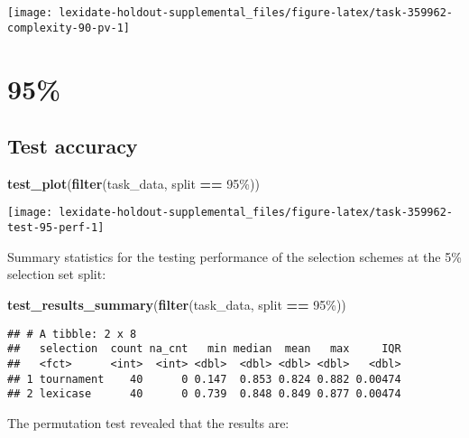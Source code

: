 \documentclass[
]{book}
\newenvironment{Shaded}{\begin{snugshade}}{\end{snugshade}}
\newcommand{\FunctionTok}[1]{\textcolor[rgb]{0.13,0.29,0.53}{\textbf{#1}}}
\newcommand{\NormalTok}[1]{#1}
\newcommand{\SpecialCharTok}[1]{\textcolor[rgb]{0.81,0.36,0.00}{\textbf{#1}}}
\newcommand{\StringTok}[1]{\textcolor[rgb]{0.31,0.60,0.02}{#1}}
\begin{document}
\texttt{[image: lexidate-holdout-supplemental\_files/figure-latex/task-359962-complexity-90-pv-1]}

\hypertarget{section-59}{%
\section{95\%}\label{section-59}}

\hypertarget{test-accuracy-59}{%
\subsection{Test accuracy}\label{test-accuracy-59}}

\begin{Shaded}
\begin{Highlighting}[]
\FunctionTok{test\_plot}\NormalTok{(}\FunctionTok{filter}\NormalTok{(task\_data, split }\SpecialCharTok{==} \StringTok{\textquotesingle{}95\%\textquotesingle{}}\NormalTok{))}
\end{Highlighting}
\end{Shaded}

\texttt{[image: lexidate-holdout-supplemental\_files/figure-latex/task-359962-test-95-perf-1]}

Summary statistics for the testing performance of the selection schemes at the 5\% selection set split:

\begin{Shaded}
\begin{Highlighting}[]
\FunctionTok{test\_results\_summary}\NormalTok{(}\FunctionTok{filter}\NormalTok{(task\_data, split }\SpecialCharTok{==} \StringTok{\textquotesingle{}95\%\textquotesingle{}}\NormalTok{))}
\end{Highlighting}
\end{Shaded}

\begin{verbatim}
## # A tibble: 2 x 8
##   selection  count na_cnt   min median  mean   max     IQR
##   <fct>      <int>  <int> <dbl>  <dbl> <dbl> <dbl>   <dbl>
## 1 tournament    40      0 0.147  0.853 0.824 0.882 0.00474
## 2 lexicase      40      0 0.739  0.848 0.849 0.877 0.00474
\end{verbatim}

The permutation test revealed that the results are:
\end{document}
